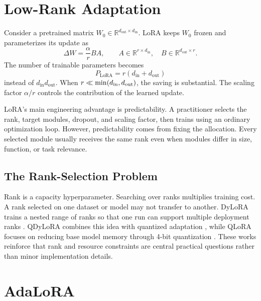 \section{Low-Rank Adaptation}

Consider a pretrained matrix $W_0 \in \mathbb{R}^{d_{\mathrm{out}}\times d_{\mathrm{in}}}$.
LoRA keeps $W_0$ frozen and parameterizes its update as
\begin{equation}
  \Delta W = \frac{\alpha}{r}BA,
  \qquad
  A \in \mathbb{R}^{r\times d_{\mathrm{in}}},
  \quad
  B \in \mathbb{R}^{d_{\mathrm{out}}\times r}.
  \label{eq:lora-scale}
\end{equation}
The number of trainable parameters becomes
\begin{equation}
  P_{\mathrm{LoRA}} = r(d_{\mathrm{in}} + d_{\mathrm{out}})
  \label{eq:lora-params}
\end{equation}
instead of $d_{\mathrm{in}}d_{\mathrm{out}}$. When
$r \ll \mathop{\rm min}\limits(d_{\mathrm{in}},d_{\mathrm{out}})$, the saving is substantial.
The scaling factor $\alpha/r$ controls the contribution of the learned update.

LoRA's main engineering advantage is predictability. A practitioner selects the rank, target
modules, dropout, and scaling factor, then trains using an ordinary optimization loop. However,
predictability comes from fixing the allocation. Every selected module usually receives the same
rank even when modules differ in size, function, or task relevance.

\subsection{The Rank-Selection Problem}

Rank is a capacity hyperparameter. Searching over ranks multiplies training cost. A rank selected
on one dataset or model may not transfer to another. DyLoRA trains a nested range of ranks so that
one run can support multiple deployment ranks \citep{valipour2023dylora}. QDyLoRA combines this
idea with quantized adaptation \citep{rajabzadeh2024qdylora}, while QLoRA focuses on reducing base
model memory through 4-bit quantization \citep{dettmers2023qlora}. These works reinforce that
rank and resource constraints are central practical questions rather than minor implementation
details.

\section{AdaLoRA}

